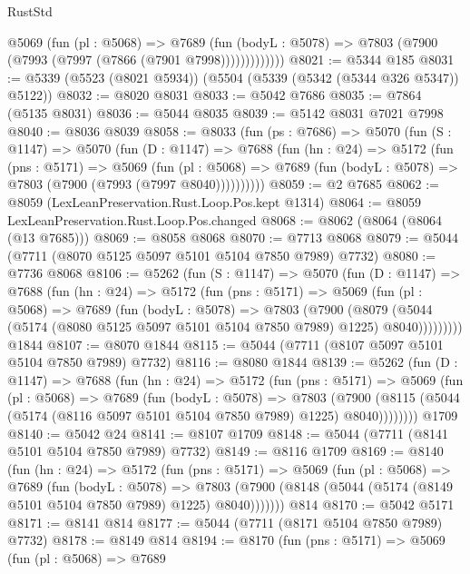 \begin{lexlean}{RustStd}
\begin{coremodule}
              @5069
                (fun (pl : @5068) =>
                @7689
                  (fun (bodyL : @5078) =>
                  @7803 (@7900 (@7993 (@7997 (@7866 (@7901 @7998)))))))))))))
@8021 := @5344 @185
@8031 := @5339 (@5523 (@8021 @5934)) (@5504 (@5339 (@5342 (@5344 @326 @5347)) @5122))
@8032 := @8020 @8031
@8033 := @5042 @7686
@8035 := @7864 (@5135 @8031)
@8036 := @5044 @8035
@8039 := @5142 @8031 @7021 @7998
@8040 := @8036 @8039
@8058 := @8033
    (fun (ps : @7686) =>
    @5070
      (fun (S : @1147) =>
      @5070
        (fun (D : @1147) =>
        @7688
          (fun (hn : @24) =>
          @5172
            (fun (pns : @5171) =>
            @5069
              (fun (pl : @5068) =>
              @7689 (fun (bodyL : @5078) => @7803 (@7900 (@7993 (@7997 @8040))))))))))
@8059 := @2 @7685
@8062 := @8059 (LexLeanPreservation.Rust.Loop.Pos.kept @1314)
@8064 := @8059 LexLeanPreservation.Rust.Loop.Pos.changed
@8068 := @8062 (@8064 (@8064 (@13 @7685)))
@8069 := @8058 @8068
@8070 := @7713 @8068
@8079 := @5044 (@7711 (@8070 @5125 @5097 @5101 @5104 @7850 @7989) @7732)
@8080 := @7736 @8068
@8106 := @5262
    (fun (S : @1147) =>
    @5070
      (fun (D : @1147) =>
      @7688
        (fun (hn : @24) =>
        @5172
          (fun (pns : @5171) =>
          @5069
            (fun (pl : @5068) =>
            @7689
              (fun (bodyL : @5078) =>
              @7803
                (@7900
                  (@8079
                    (@5044 (@5174 (@8080 @5125 @5097 @5101 @5104 @7850 @7989) @1225) @8040)))))))))
    @1844
@8107 := @8070 @1844
@8115 := @5044 (@7711 (@8107 @5097 @5101 @5104 @7850 @7989) @7732)
@8116 := @8080 @1844
@8139 := @5262
    (fun (D : @1147) =>
    @7688
      (fun (hn : @24) =>
      @5172
        (fun (pns : @5171) =>
        @5069
          (fun (pl : @5068) =>
          @7689
            (fun (bodyL : @5078) =>
            @7803
              (@7900 (@8115 (@5044 (@5174 (@8116 @5097 @5101 @5104 @7850 @7989) @1225) @8040))))))))
    @1709
@8140 := @5042 @24
@8141 := @8107 @1709
@8148 := @5044 (@7711 (@8141 @5101 @5104 @7850 @7989) @7732)
@8149 := @8116 @1709
@8169 := @8140
    (fun (hn : @24) =>
    @5172
      (fun (pns : @5171) =>
      @5069
        (fun (pl : @5068) =>
        @7689
          (fun (bodyL : @5078) =>
          @7803 (@7900 (@8148 (@5044 (@5174 (@8149 @5101 @5104 @7850 @7989) @1225) @8040)))))))
    @814
@8170 := @5042 @5171
@8171 := @8141 @814
@8177 := @5044 (@7711 (@8171 @5104 @7850 @7989) @7732)
@8178 := @8149 @814
@8194 := @8170
    (fun (pns : @5171) =>
    @5069
      (fun (pl : @5068) =>
      @7689

\end{coremodule}
\end{lexlean}

